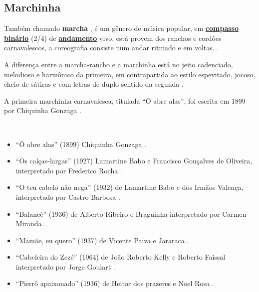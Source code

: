 \subsection{Marchinha} 
\label{subsec:marcha}
Também chamado \textbf{marcha} \cite[pp. 448]{marcondes1977enciclopedia},
é um gênero de música popular, em \hyperref[subsec:compassobinario]{\textbf{compasso binário}} (2/4) de \hyperref[sec:Andamento]{\textbf{andamento}} vivo, 
está provem dos ranchos e cordões carnavalescos, a coreografia consiste num andar ritmado e em voltas. \cite[pp. 65]{reinato2010musica}.

A diferença entre a marcha-rancho e  a marchinha está no jeito cadenciado, 
melodioso e harmônico da primeira, em contrapartida ao estilo espevitado,
jocoso, cheio de sátiras e com letras de duplo sentido da segunda \cite[pp. 84,87]{diniz2008almanaque}.

A primeira marchinha carnavalesca, titulada ``Ô abre alas'', foi escrita em 1899 por Chiquinha Gonzaga \cite[pp. 84, 239]{diniz2008almanaque}.

\begin{example} ~

\begin{itemize}
\item ``Ô abre alas'' (1899) Chiquinha Gonzaga  \cite[pp. 84, 239]{diniz2008almanaque}.
\item ``Os calças-largas'' (1927) Lamartine Babo e Francisco Gonçalves de Oliveira,
interpretado por Frederico Rocha \cite[pp. 91]{diniz2008almanaque}.
\item ``O teu cabelo não nega'' (1932) de Lamartine Babo e dos Irmãos Valença, interpretado por Castro Barbosa \cite[pp. 99]{diniz2008almanaque}.
\item ``Balancê'' (1936) de Alberto Ribeiro e Braguinha interpretado por Carmen Miranda \cite[pp. 83]{diniz2008almanaque}.
\item ``Mamãe, eu quero'' (1937) de Vicente Paiva e Jararaca \cite[pp. 584]{marcondes1977enciclopediav2} \cite[pp. 93]{diniz2008almanaque}.
\item ``Cabeleira do Zezé'' (1964) de João Roberto Kelly e Roberto Faissal interpretado por Jorge Goulart \cite[pp. 117,118]{diniz2008almanaque}.
\item ``Pierrô apaixonado'' (1936) de Heitor dos prazeres e Noel Rosa \cite[pp. 1070]{marcondes1977enciclopediav2} \cite[pp. 53]{diniz2008almanaque}.
\end{itemize}
\end{example}

